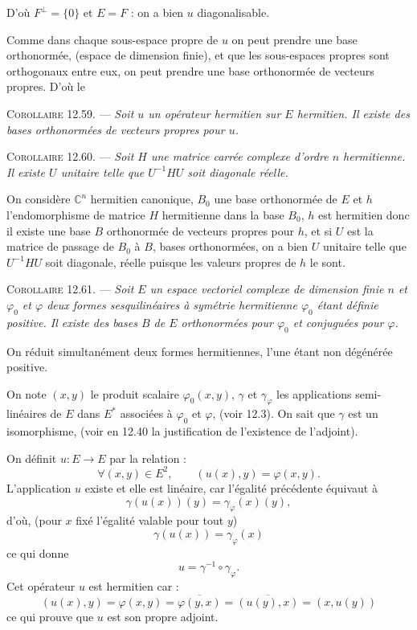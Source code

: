 D'où $F^\perp=\{0\}$ et $E=F$ : on a bien $u$ diagonalisable. \bookend

Comme dans chaque sous-espace propre de $u$ on peut prendre une base orthonormée, (espace de dimension finie), et que les sous-espaces propres sont orthogonaux entre eux, on peut prendre une base orthonormée de vecteurs propres. D'où le

\medskip\noindent\textsc{Corollaire 12.59.} --- \emph{Soit $u$ un opérateur hermitien sur $E$ hermitien. Il existe des bases orthonormées de vecteurs propres pour $u$.}

\medskip\noindent\textsc{Corollaire 12.60.} --- \emph{Soit $H$ une matrice carrée complexe d'ordre $n$ hermitienne. Il existe $U$ unitaire telle que $U^{-1}HU$ soit diagonale réelle.}

On considère $\mathbb C^n$ hermitien canonique, $B_0$ une base orthonormée de $E$ et $h$ l'endomorphisme de matrice $H$ hermitienne dans la base $B_0$, $h$ est hermitien donc il existe une base $B$ orthonormée de vecteurs propres pour $h$, et si $U$ est la matrice de passage de $B_0$ à $B$, bases orthonormées, on a bien $U$ unitaire telle que $U^{-1}HU$ soit diagonale, réelle puisque les valeurs propres de $h$ le sont. \bookend

\medskip\noindent\textsc{Corollaire 12.61.} --- \emph{Soit $E$ un espace vectoriel complexe de dimension finie $n$ et $\varphi_0$ et $\varphi$ deux formes sesquilinéaires à symétrie hermitienne $\varphi_0$ étant définie positive. Il existe des bases $B$ de $E$ orthonormées pour $\varphi_0$ et conjuguées pour $\varphi$.}

On réduit simultanément deux formes hermitiennes, l'une étant non dégénérée positive.

On note $(x,y)$ le produit scalaire $\varphi_0(x,y)$, $\gamma$ et $\gamma_\varphi$ les applications semi-linéaires de $E$ dans $E^*$ associées à $\varphi_0$ et $\varphi$, (voir 12.3). On sait que $\gamma$ est un isomorphisme, (voir en 12.40 la justification de l'existence de l'adjoint).

On définit $u:E\longrightarrow E$ par la relation :
\[
\forall(x,y)\in E^2,\qquad (u(x),y)=\varphi(x,y).
\]
L'application $u$ existe et elle est linéaire, car l'égalité précédente équivaut à
\[
\gamma(u(x))(y)=\gamma_\varphi(x)(y),
\]
d'où, (pour $x$ fixé l'égalité valable pour tout $y$)
\[
\gamma(u(x))=\gamma_\varphi(x)
\]
ce qui donne
\[
u=\gamma^{-1}\circ\gamma_\varphi.
\]
Cet opérateur $u$ est hermitien car :
\[
(u(x),y)=\varphi(x,y)=\overline{\varphi(y,x)}=\overline{(u(y),x)}=(x,u(y))
\]
ce qui prouve que $u$ est son propre adjoint.

